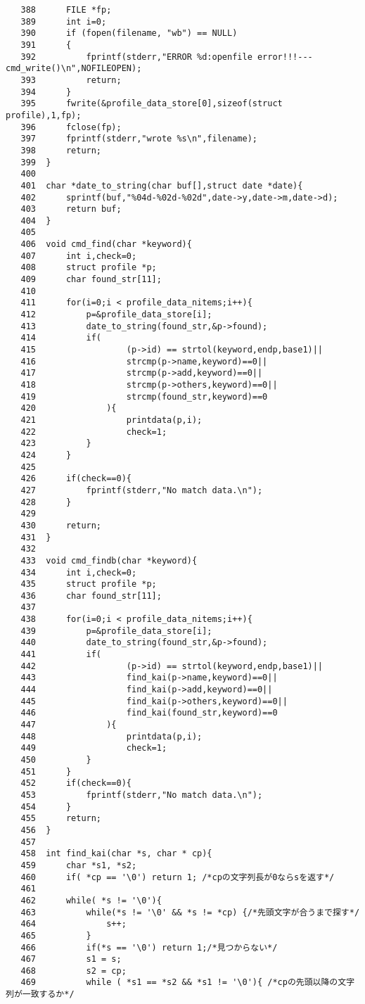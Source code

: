\documentclass[a4j,11pt]{jarticle}
\begin{document}
{\begin{verbatim}
   388	    FILE *fp;
   389	    int i=0;
   390	    if (fopen(filename, "wb") == NULL)
   391	    {
   392	        fprintf(stderr,"ERROR %d:openfile error!!!---cmd_write()\n",NOFILEOPEN);
   393	        return;
   394	    }
   395	    fwrite(&profile_data_store[0],sizeof(struct profile),1,fp);
   396	    fclose(fp);
   397	    fprintf(stderr,"wrote %s\n",filename);
   398	    return;
   399	}
   400	
   401	char *date_to_string(char buf[],struct date *date){
   402	    sprintf(buf,"%04d-%02d-%02d",date->y,date->m,date->d);
   403	    return buf;
   404	}
   405	
   406	void cmd_find(char *keyword){
   407	    int i,check=0;
   408	    struct profile *p;
   409	    char found_str[11];
   410	    
   411	    for(i=0;i < profile_data_nitems;i++){
   412	        p=&profile_data_store[i];
   413	        date_to_string(found_str,&p->found);
   414	        if( 
   415	                (p->id) == strtol(keyword,endp,base1)||
   416	                strcmp(p->name,keyword)==0||
   417	                strcmp(p->add,keyword)==0||
   418	                strcmp(p->others,keyword)==0||
   419	                strcmp(found_str,keyword)==0
   420	            ){
   421	                printdata(p,i);
   422	                check=1;
   423	        }
   424	    }
   425	    
   426	    if(check==0){
   427	        fprintf(stderr,"No match data.\n");
   428	    }
   429	    
   430	    return;
   431	}
   432	
   433	void cmd_findb(char *keyword){
   434	    int i,check=0;
   435	    struct profile *p;
   436	    char found_str[11];
   437	    
   438	    for(i=0;i < profile_data_nitems;i++){
   439	        p=&profile_data_store[i];
   440	        date_to_string(found_str,&p->found);
   441	        if( 
   442	                (p->id) == strtol(keyword,endp,base1)||
   443	                find_kai(p->name,keyword)==0||
   444	                find_kai(p->add,keyword)==0||
   445	                find_kai(p->others,keyword)==0||
   446	                find_kai(found_str,keyword)==0
   447	            ){
   448	                printdata(p,i);
   449	                check=1;
   450	        }
   451	    }
   452	    if(check==0){
   453	        fprintf(stderr,"No match data.\n");
   454	    }
   455	    return;
   456	}
   457	
   458	int find_kai(char *s, char * cp){
   459		char *s1, *s2;
   460		if( *cp == '\0') return 1; /*cpの文字列長が0ならsを返す*/ 
   461	
   462		while( *s != '\0'){
   463			while(*s != '\0' && *s != *cp) {/*先頭文字が合うまで探す*/
   464				s++;
   465			}
   466			if(*s == '\0') return 1;/*見つからない*/
   467			s1 = s;
   468			s2 = cp;
   469			while ( *s1 == *s2 && *s1 != '\0'){ /*cpの先頭以降の文字列が一致するか*/

\end{verbatim}}
\end{document}

